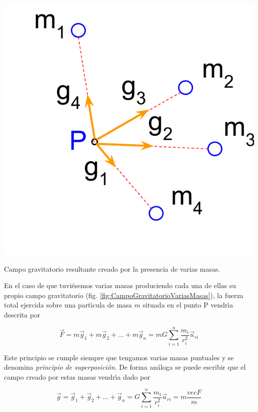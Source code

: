 \begin{marginfigure}
  \includegraphics[width=\linewidth]{CampoGravitatorioVariasMasas.pdf}
  \caption{Campo gravitatorio resultante creado por la presencia de varias masas.}
  \label{fig:CampoGravitatorioVariasMasas}
\end{marginfigure}

En el caso de que tuvi\'esemos varias masas  produciendo cada una de ellas su propio campo gravitatorio (fig. \ref{fig:CampoGravitatorioVariasMasas}), la fuerza total ejercida sobre una part\'\i{}cula de masa $m$ situada en el punto P vendr\'\i{}a descrita por 

\begin{equation}
\vec{F}=m\vec{g}_1+m\vec{g}_2+...+m\vec{g}_n=mG\sum_{i=1}^{n}\frac{m_i}{r_i^2}\vec{u}_{ri}
\label{eq:FuerzaCampoGravitatorioVariasMasas}
\end{equation}

Este principio se cumple siempre que tengamos varias masas puntuales y se denomina \emph{principio de superposici\'on}. De forma an\'aloga se puede escribir que el campo creado por estas masas vendr\'\i{}a dado por

\begin{equation}
\vec{g}=\vec{g}_1+\vec{g}_2+...+\vec{g}_n=G\sum_{i=1}^{n}\frac{m_i}{r_i^2}\vec{u}_{ri}=m\frac{vec{F}}{m}
\label{eq:CampoGravitatorioVariasMasas}
\end{equation}

